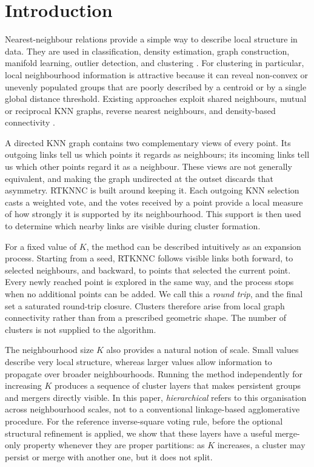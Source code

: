 \documentclass[review,12pt]{elsarticle}
\begin{document}
\section{Introduction}\label{sec:introduction}

Nearest-neighbour relations provide a simple way to describe local structure in
data. They are used in classification, density estimation, graph construction,
manifold learning, outlier detection, and clustering
\citep{CoverHart1967,LoftsgaardenQuesenberry1965,Bentley1975,FriedmanBentleyFinkel1977,VonLuxburg2007}.
For clustering in particular, local neighbourhood information is attractive
because it can reveal non-convex or unevenly populated groups that are poorly
described by a centroid or by a single global distance threshold. Existing
approaches exploit shared neighbours, mutual or reciprocal KNN graphs, reverse
nearest neighbours, and density-based connectivity
\citep{JarvisPatrick1973,Ertoz2003SNN,BritoChavezQuirozYukich1997,GowdaKrishna1978,ChowdhuryAmorim2018,XieLeeWangChenZhou2019}.

A directed KNN graph contains two complementary views of every point. Its
outgoing links tell us which points it regards as neighbours; its incoming
links tell us which other points regard it as a neighbour. These views are not
generally equivalent, and making the graph undirected at the outset discards
that asymmetry. RTKNNC is built around keeping it. Each outgoing KNN selection
casts a weighted vote, and the votes received by a point provide a local measure
of how strongly it is supported by its neighbourhood. This support is then used
to determine which nearby links are visible during cluster formation.

For a fixed value of $K$, the method can be described intuitively as an
expansion process. Starting from a seed, RTKNNC follows visible links both
forward, to selected neighbours, and backward, to points that selected the
current point. Every newly reached point is explored in the same way, and the
process stops when no additional points can be added. We call this a
\emph{round trip}, and the final set a saturated round-trip closure. Clusters
therefore arise from local graph connectivity rather than from a prescribed
geometric shape. The number of clusters is not supplied to the algorithm.

The neighbourhood size $K$ also provides a natural notion of scale. Small
values describe very local structure, whereas larger values allow information
to propagate over broader neighbourhoods. Running the method independently for
increasing $K$ produces a sequence of cluster layers that makes persistent
groups and mergers directly visible. In this paper, \emph{hierarchical} refers
to this organisation across neighbourhood scales, not to a conventional
linkage-based agglomerative procedure. For the reference inverse-square voting
rule, before the optional structural refinement is applied, we show that these
layers have a useful merge-only property whenever they are proper partitions:
as $K$ increases, a cluster may persist or merge with another one, but it does
not split.
\end{document}
